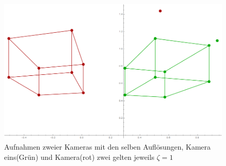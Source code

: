 


\begin{figure}[!htb]
	\centering
	\includegraphics[width=.8\linewidth]{images/Rectification_one_same_Solutions.png}
	\caption[virtuelle Aufnahme eines Quaders für die Rektifizierung]{Aufnahmen zweier Kameras mit den selben Auflösungen, Kamera eins(Grün) und Kamera(rot) zwei gelten jeweils \ensuremath{\zeta =1}}
	\label{fig:RectOriginal} 
\end{figure}
\pagebreak


